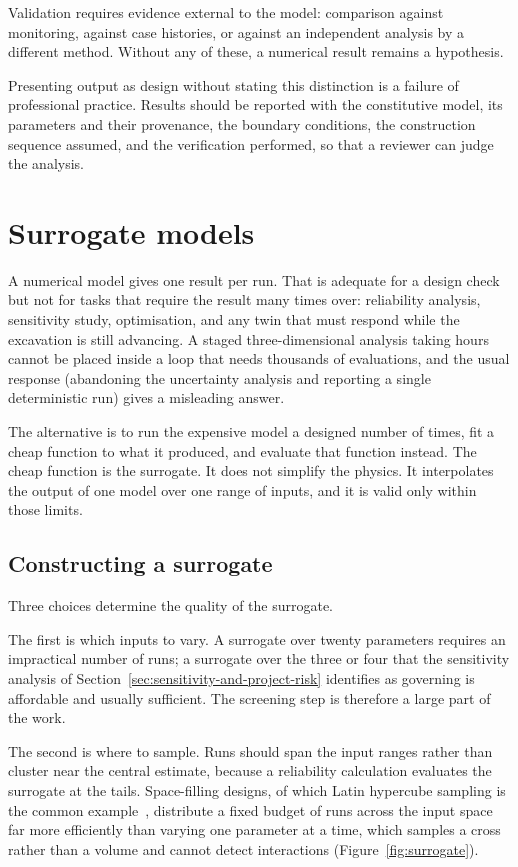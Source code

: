Validation requires evidence external to the model: comparison against
monitoring, against case histories, or against an independent analysis by a
different method. Without any of these, a numerical result remains a hypothesis.

Presenting output as design without stating this distinction is a failure of
professional practice. Results should be reported with the
constitutive model, its parameters and their provenance, the boundary
conditions, the construction sequence assumed, and the verification performed,
so that a reviewer can judge the analysis.

\section{Surrogate models}
\label{sec:surrogate-models}

A numerical model gives one result per run. That is adequate for a design
check but not for tasks that require the result many times over:
reliability analysis, sensitivity study, optimisation, and any twin that must
respond while the excavation is still advancing. A staged three-dimensional
analysis taking hours cannot be placed inside a loop that needs thousands of
evaluations, and the usual response (abandoning the uncertainty analysis
and reporting a single deterministic run) gives a
misleading answer.

The alternative is to run the expensive model a designed number of times, fit
a cheap function to what it produced, and evaluate that function instead. The
cheap function is the surrogate. It does not simplify the physics. It
interpolates the output of one model over one range
of inputs, and it is valid only within those limits.

\subsection{Constructing a surrogate}
\label{sec:constructing-surrogate}

Three choices determine the quality of the surrogate.

The first is which inputs to vary. A surrogate over twenty parameters requires
an impractical number of runs; a surrogate over the three or four that the
sensitivity analysis of Section~\ref{sec:sensitivity-and-project-risk}
identifies as governing is affordable and usually sufficient. The screening
step is therefore a large part of the work.

The second is where to sample. Runs should span the input ranges rather than
cluster near the central estimate, because a reliability calculation evaluates the surrogate
at the tails. Space-filling
designs, of which Latin hypercube sampling is the common
example~\citep{sacks1989design}, distribute a fixed budget of runs across the
input space far more efficiently than varying one parameter at a time, which
samples a cross rather than a volume and cannot detect interactions
(Figure~\ref{fig:surrogate}).

